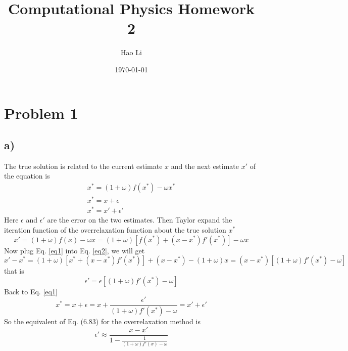 \documentclass[12pt, graphicx]{article}
\begin{document}
\title{Computational Physics Homework 2}
\author{Hao Li\footnotemark[2]}
\date{\today}


\maketitle

\section*{Problem 1}
\subsection*{a)}
The true solution is related to the current estimate $x$ and the next estimate $x'$ of the equation is 
\begin{equation}
\begin{gathered}
x^*=(1+\omega)f(x^*)-\omega x^*\\
x^*=x+\epsilon\\
x^*=x'+\epsilon'
\end{gathered}
\label{eq1}
\end{equation} 
Here $\epsilon$ and $\epsilon'$ are the error on the two estimates. Then Taylor expand the iteration function of the overrelaxation function about the true solution $x^*$
\begin{equation}
x'=(1+\omega)f(x)-\omega x=(1+\omega)[f(x^*)+(x-x^*)f'(x^*)]-\omega x
\label{eq2}
\end{equation}
Now plug Eq. \ref{eq1} into Eq. \ref{eq2}, we will get 
\begin{equation}
x'-x^*=(1+\omega)[x^*+(x-x^*)f'(x^*)]+(x-x^*)-(1+\omega)x=(x-x^*)[(1+\omega)f'(x^*)-\omega]
\end{equation}
that is
\begin{equation}
\epsilon'=\epsilon[(1+\omega)f'(x^*)-\omega]
\end{equation}
Back to Eq. \ref{eq1}
\begin{equation}
x^*=x+\epsilon=x+\frac{\epsilon'}{(1+\omega)f'(x^*)-\omega}=x'+\epsilon'
\end{equation}
So the equivalent of Eq. (6.83) for the overrelaxation method is 
\begin{equation}
\epsilon'\approx\frac{x-x'}{1-\frac{1}{(1+\omega)f'(x)-\omega}}
\label{eq4}
\end{equation}
\end{document}
